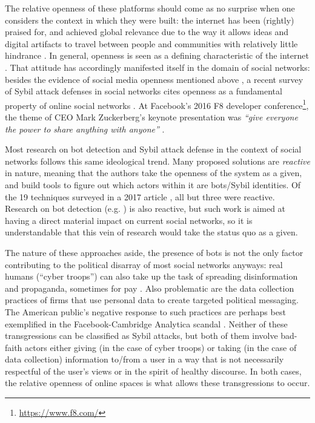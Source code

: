 \documentclass[sigconf,authordraft]{acmart}
\begin{document}
The relative openness of these platforms should come as no surprise when one considers the context in which they were built: the internet has been (rightly) praised for, and achieved global relevance due to the way it allows ideas and digital artifacts to travel between people and communities with relatively little hindrance \cite{box2016internet, box2016economic}. In general, openness is seen as a defining characteristic of the internet \cite{bechmann2014ubiquitous, lessig2002future, daigle2015nature}. That attitude has accordingly manifested itself in the domain of social networks: besides the evidence of social media openness mentioned above \cite{rashtian2014befriend, park2009being}, a recent survey of Sybil attack defenses in social networks cites openness as a fundamental property of online social networks \cite{al2017sybil}. At Facebook's 2016 F8 developer conference\footnote{\url{https://www.f8.com/}}, the theme of CEO Mark Zuckerberg's keynote presentation was {\itshape ``give everyone the power to share anything with anyone'' }\cite{USAtoday_F8_keynote_sharequote}. 

Most research on bot detection and Sybil attack defense in the context of social networks follows this same ideological trend. Many proposed solutions are {\itshape reactive} in nature, meaning that the authors take the openness of the system as a given, and build tools to figure out which actors within it are bots/Sybil identities. Of the 19 techniques surveyed in a 2017 article \cite{al2017sybil}, all but three \cite{yu2006sybilguard,yu2008sybillimit,Tran2011Gatekeeper} were reactive. Research on bot detection (e.g. \cite{davis2016botornot}) is also reactive, but such work is aimed at having a direct material impact on current social networks, so it is understandable that this vein of research would take the status quo as a given.

 
The nature of these approaches aside, the presence of bots is not the only factor contributing to the political disarray of most social networks anyways: real humans (``cyber troops'') can also take up the task of spreading disinformation and propaganda, sometimes for pay \cite{bradshaw2017troops}. Also problematic are the data collection practices of firms that use personal data to create targeted political messaging. The American public's negative response to such practices are perhaps best exemplified in the Facebook-Cambridge Analytica scandal \cite{CambridgeAnalyticaNYT}. Neither of these transgressions can be classified as Sybil attacks, but both of them involve bad-faith actors either giving (in the case of cyber troops) or taking (in the case of data collection) information to/from a user in a way that is not necessarily respectful of the user's views or in the spirit of healthy discourse. In both cases, the relative openness of online spaces is what allows these transgressions to occur.
\end{document}
